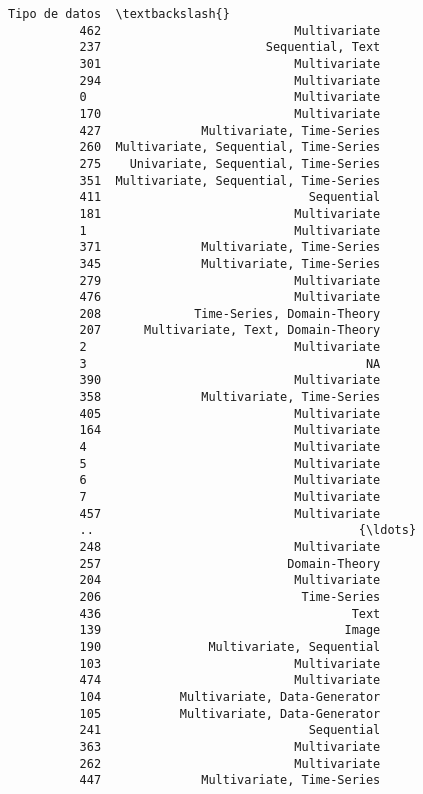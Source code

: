 \documentclass[11pt]{article}
\begin{document}
\begin{Verbatim}[commandchars=\\\{\}]
                                       Tipo de datos  \textbackslash{}
          462                           Multivariate   
          237                       Sequential, Text   
          301                           Multivariate   
          294                           Multivariate   
          0                             Multivariate   
          170                           Multivariate   
          427              Multivariate, Time-Series   
          260  Multivariate, Sequential, Time-Series   
          275    Univariate, Sequential, Time-Series   
          351  Multivariate, Sequential, Time-Series   
          411                             Sequential   
          181                           Multivariate   
          1                             Multivariate   
          371              Multivariate, Time-Series   
          345              Multivariate, Time-Series   
          279                           Multivariate   
          476                           Multivariate   
          208             Time-Series, Domain-Theory   
          207      Multivariate, Text, Domain-Theory   
          2                             Multivariate   
          3                                       NA   
          390                           Multivariate   
          358              Multivariate, Time-Series   
          405                           Multivariate   
          164                           Multivariate   
          4                             Multivariate   
          5                             Multivariate   
          6                             Multivariate   
          7                             Multivariate   
          457                           Multivariate   
          ..                                     {\ldots}   
          248                           Multivariate   
          257                          Domain-Theory   
          204                           Multivariate   
          206                            Time-Series   
          436                                   Text   
          139                                  Image   
          190               Multivariate, Sequential   
          103                           Multivariate   
          474                           Multivariate   
          104           Multivariate, Data-Generator   
          105           Multivariate, Data-Generator   
          241                             Sequential   
          363                           Multivariate   
          262                           Multivariate   
          447              Multivariate, Time-Series   

\end{Verbatim}
\end{document}

